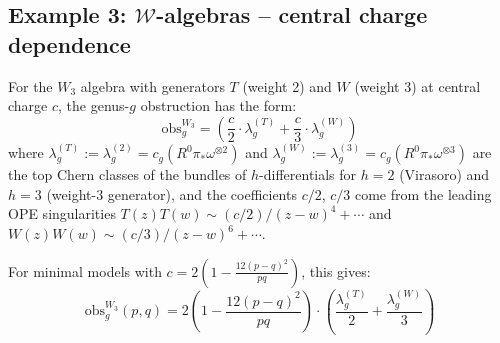 \subsection{Example 3: $\mathcal{W}$-algebras -- central charge dependence}
\label{subsec:w-algebra-obstruction}

\begin{theorem}\label{thm:w3-obstruction}
For the $W_3$ algebra with generators $T$ (weight 2) and $W$ (weight 3) at 
central charge $c$, the genus-$g$ obstruction has the form:
\begin{equation}
\text{obs}_g^{W_3} = \left(\frac{c}{2} \cdot \lambda_g^{(T)} + 
\frac{c}{3} \cdot \lambda_g^{(W)}\right)
\end{equation}
where $\lambda_g^{(T)} := \lambda_g^{(2)} = c_g(R^0\pi_*\omega^{\otimes 2})$ and
$\lambda_g^{(W)} := \lambda_g^{(3)} = c_g(R^0\pi_*\omega^{\otimes 3})$ are the top
Chern classes of the bundles of $h$-differentials for $h = 2$ (Virasoro) and $h = 3$
(weight-$3$ generator), and the coefficients $c/2$, $c/3$ come from the leading OPE
singularities $T(z)T(w) \sim (c/2)/(z-w)^4 + \cdots$ and
$W(z)W(w) \sim (c/3)/(z-w)^6 + \cdots$.

For minimal models with $c = 2(1 - \frac{12(p-q)^2}{pq})$, this gives:
\[\text{obs}_g^{W_3}(p,q) = 2\left(1 - \frac{12(p-q)^2}{pq}\right) \cdot 
\left(\frac{\lambda_g^{(T)}}{2} + \frac{\lambda_g^{(W)}}{3}\right)\]
\end{theorem}

